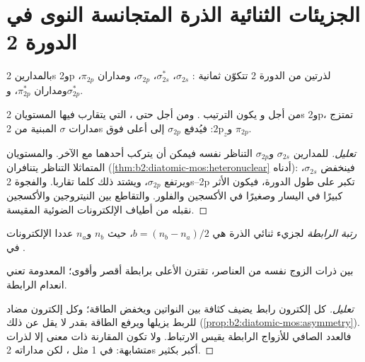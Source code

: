 \section{الجزيئات الثنائية الذرة المتجانسة النوى في الدورة 2}

بالمدارين 2s و2p لذرتين من الدورة 2 تتكوّن ثمانية :
$\sigma_{2s}$، $\sigma^*_{2s}$، $\sigma_{2p}$، ومداران $\pi_{2p}$، ومداران $\pi^*_{2p}$،
و$\sigma^*_{2p}$.

\begin{proposition}[مزج s--p]\label{prop:b2:diatomic-mos:sp-mixing}
من أجل  و يكون الترتيب . ومن أجل  حتى ، التي يتقارب فيها المستويان 2s و2p،
تمتزج مدارات $\sigma$ المبنية من 2s و$2\mathrm p_z$: فيُدفع $\sigma_{2p}$ إلى أعلى فوق
$\pi_{2p}$.
\end{proposition}

\begin{proof}[تعليل]
للمدارين $\sigma_{2s}$ و$\sigma_{2p}$ التناظر نفسه فيمكن أن يتركب أحدهما مع
الآخر. والمستويان المتماثلا التناظر يتنافران (\cref{thm:b2:diatomic-mos:heteronuclear}
أدناه): فينخفض $\sigma_{2s}$، ويرتفع $\sigma_{2p}$، ويشتد ذلك كلما تقاربا. والفجوة
2s--2p تكبر على طول الدورة، فيكون الأثر كبيرًا في اليسار وصغيرًا في
الأكسجين والفلور. والتقاطع بين النيتروجين والأكسجين نقبله من
أطياف الإلكترونات الضوئية المقيسة.
\end{proof}

\begin{definition}\label{def:b2:diatomic-mos:bond-order}
\emph{رتبة الرابطة} لجزيء ثنائي الذرة هي $b = (n_b -
n_a)/2$، حيث $n_b$ و$n_a$ عددا الإلكترونات في  .
\end{definition}

\begin{proposition}\label{prop:b2:diatomic-mos:bond-order}
بين ذرات الزوج نفسه من العناصر، تقترن  الأعلى برابطة
أقصر وأقوى؛  المعدومة تعني انعدام الرابطة.
\end{proposition}

\begin{proof}[تعليل]
كل إلكترون رابط يضيف كثافة بين النواتين ويخفض الطاقة؛
وكل إلكترون مضاد للربط يزيلها ويرفع الطاقة بقدر لا يقل عن ذلك
(\cref{prop:b2:diatomic-mos:asymmetry}). فالعدد الصافي للأزواج الرابطة يقيس
الارتباط. ولا تكون المقارنة ذات معنى إلا لذرات متشابهة:  في 
1 مثل ، لكن مداراته 2s أكبر بكثير.
\end{proof}

